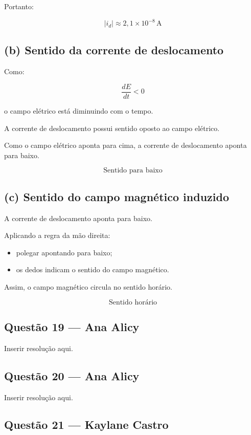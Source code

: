 \documentclass[12pt,a4paper]{article}
\begin{document}
Portanto:

\[
\boxed{|i_d|\approx 2,1\times10^{-8}\,\text{A}}
\]


\subsection*{(b) Sentido da corrente de deslocamento}

Como:

\[
\frac{dE}{dt}<0
\]

o campo elétrico está diminuindo com o tempo.

A corrente de deslocamento possui sentido oposto ao campo elétrico.

Como o campo elétrico aponta para cima, a corrente de deslocamento aponta para baixo.

\[
\boxed{\text{Sentido para baixo}}
\]


\subsection*{(c) Sentido do campo magnético induzido}

A corrente de deslocamento aponta para baixo.

Aplicando a regra da mão direita:

\begin{itemize}
    \item polegar apontando para baixo;
    \item os dedos indicam o sentido do campo magnético.
\end{itemize}

Assim, o campo magnético circula no sentido horário.

\[
\boxed{\text{Sentido horário}}
\]
\subsection{Questão 19 — Ana Alicy}
Inserir resolução aqui.

\subsection{Questão 20 — Ana Alicy}
Inserir resolução aqui.

\subsection{Questão 21 — Kaylane Castro}
\end{document}
